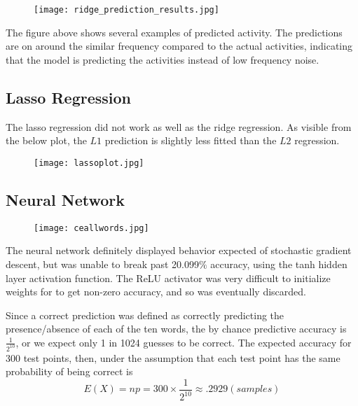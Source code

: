 \begin{figure}[H]
 \centering
 \texttt{[image: ridge\_prediction\_results.jpg]}
  \label{fig:test1}
\end{figure}
The figure above shows several examples of predicted activity. The predictions are on around the similar frequency compared to the actual activities, indicating that the model is predicting the activities instead of low frequency noise.

\subsection{Lasso Regression}
\par The lasso regression did not work as well as the ridge regression. As visible from the below plot, the $L1$ prediction is slightly less fitted than the $L2$ regression.

\begin{figure}[H]
 \centering
 \texttt{[image: lassoplot.jpg]}
  \label{fig:cc}
\end{figure}

\subsection{Neural Network}
\begin{figure}[H]
 \centering
 \texttt{[image: ceallwords.jpg]}
  \label{fig:test1}
\end{figure}

\par The neural network definitely displayed behavior expected of stochastic gradient descent, but was unable to break past 20.099$\%$ accuracy, using the tanh hidden layer activation function. The ReLU activator was very difficult to initialize weights for to get non-zero accuracy, and so was eventually discarded. 

\par Since a correct prediction was defined as correctly predicting the presence/absence of each of the ten words, the by chance predictive accuracy is $\frac{1}{2^{10}}$, or we expect only 1 in 1024 guesses to be correct. The expected accuracy for 300 test points, then, under the assumption that each test point has the same probability of being correct is 
$$E(X) = np = 300\times \frac{1}{2^{10}} \approx .2929  (samples)$$

